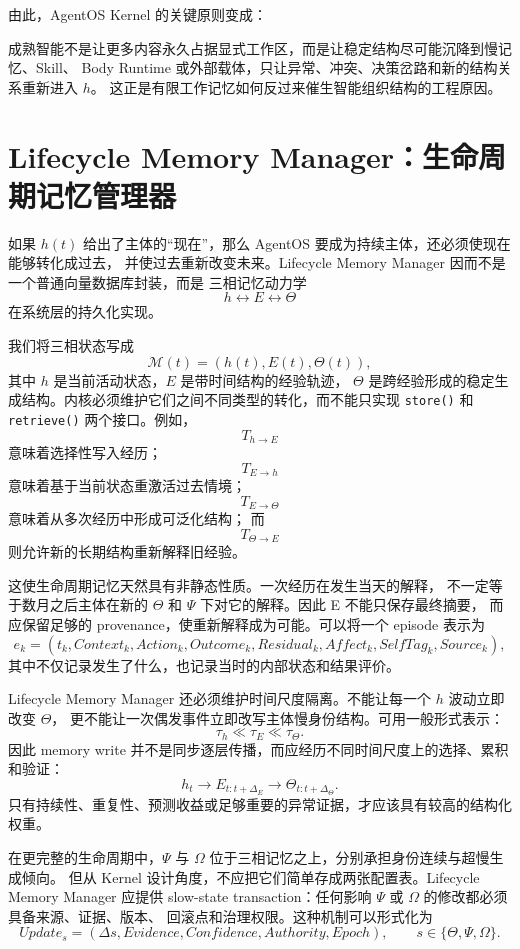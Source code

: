 由此，AgentOS Kernel 的关键原则变成：
\begin{statementbox}
\centering
{}
\end{statementbox}
成熟智能不是让更多内容永久占据显式工作区，而是让稳定结构尽可能沉降到慢记忆、Skill、
Body Runtime 或外部载体，只让异常、冲突、决策岔路和新的结构关系重新进入 $h$。
这正是有限工作记忆如何反过来催生智能组织结构的工程原因。


\section{Lifecycle Memory Manager：生命周期记忆管理器}

如果 $h(t)$ 给出了主体的``现在''，那么 AgentOS 要成为持续主体，还必须使现在能够转化成过去，
并使过去重新改变未来。Lifecycle Memory Manager 因而不是一个普通向量数据库封装，而是
三相记忆动力学
\[
h\leftrightarrow E\leftrightarrow\Theta
\]
在系统层的持久化实现。

我们将三相状态写成
\[
\mathcal M(t)
=
\left(
h(t),E(t),\Theta(t)
\right),
\]
其中 $h$ 是当前活动状态，$E$ 是带时间结构的经验轨迹，
$\Theta$ 是跨经验形成的稳定生成结构。内核必须维护它们之间不同类型的转化，而不能只实现
\texttt{store()} 和 \texttt{retrieve()} 两个接口。例如，
\[
T_{h\rightarrow E}
\]
意味着选择性写入经历；
\[
T_{E\rightarrow h}
\]
意味着基于当前状态重激活过去情境；
\[
T_{E\rightarrow\Theta}
\]
意味着从多次经历中形成可泛化结构；
而
\[
T_{\Theta\rightarrow E}
\]
则允许新的长期结构重新解释旧经验。

这使生命周期记忆天然具有非静态性质。一次经历在发生当天的解释，
不一定等于数月之后主体在新的 $\Theta$ 和 $\Psi$ 下对它的解释。因此 E 不能只保存最终摘要，
而应保留足够的 provenance，使重新解释成为可能。可以将一个 episode 表示为
\[
e_k=
(
t_k,
Context_k,
Action_k,
Outcome_k,
Residual_k,
Affect_k,
SelfTag_k,
Source_k
),
\]
其中不仅记录发生了什么，也记录当时的内部状态和结果评价。

Lifecycle Memory Manager 还必须维护时间尺度隔离。不能让每一个 $h$ 波动立即改变 $\Theta$，
更不能让一次偶发事件立即改写主体慢身份结构。可用一般形式表示：
\[
\tau_h\ll\tau_E\ll\tau_\Theta.
\]
因此 memory write 并不是同步逐层传播，而应经历不同时间尺度上的选择、累积和验证：
\[
h_t
\rightarrow
E_{t:t+\Delta_E}
\rightarrow
\Theta_{t:t+\Delta_\Theta}.
\]
只有持续性、重复性、预测收益或足够重要的异常证据，才应该具有较高的结构化权重。

在更完整的生命周期中，$\Psi$ 与 $\Omega$ 位于三相记忆之上，分别承担身份连续与超慢生成倾向。
但从 Kernel 设计角度，不应把它们简单存成两张配置表。Lifecycle Memory Manager 应提供
slow-state transaction：任何影响 $\Psi$ 或 $\Omega$ 的修改都必须具备来源、证据、版本、
回滚点和治理权限。这种机制可以形式化为
\[
Update_s
=
(\Delta s, Evidence, Confidence, Authority, Epoch),
\qquad
s\in\{\Theta,\Psi,\Omega\}.
\]

